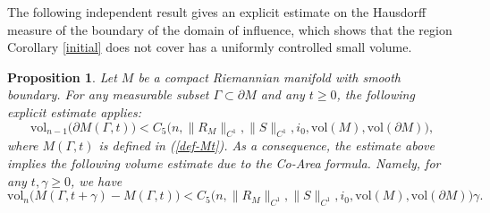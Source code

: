 \documentclass[11pt,letterpaper]{amsart}
\numberwithin{equation}{section}
\theoremstyle{definition}
\theoremstyle{plain}
\theoremstyle{definition}
\theoremstyle{plain}
\newtheorem{area}[main1]{Proposition}
\theoremstyle{definition}
\theoremstyle{plain}
\newcommand{\vol}{\textrm{vol}}
\begin{document}
The following independent result gives an explicit estimate on the Hausdorff measure of the boundary of the domain of influence, which shows that the region Corollary \ref{initial} does not cover has a uniformly controlled small volume.

\begin{area}\label{area}
Let $M$ be a compact Riemannian manifold with smooth boundary. For any measurable subset $\Gamma\subset \partial M$ and any $t\geqslant 0$, the following explicit estimate applies:
$$\vol_{n-1} \big(\partial M(\Gamma,t)\big)<C_5 \big(n,\|R_M\|_{C^1},\|S\|_{C^1},i_0,\vol(M),\vol(\partial M) \big),$$
where $M(\Gamma,t)$ is defined in (\ref{def-Mt}). As a consequence, the estimate above implies the following volume estimate due to the Co-Area formula. Namely, for any $t,\gamma\geqslant 0$, we have
$$\vol_n \big(M(\Gamma,t+\gamma)-M(\Gamma,t)\big)< C_5 \big(n,\|R_M\|_{C^1},\|S\|_{C^1},i_0,\vol(M),\vol(\partial M) \big)\gamma.$$
\end{area}
\end{document}
